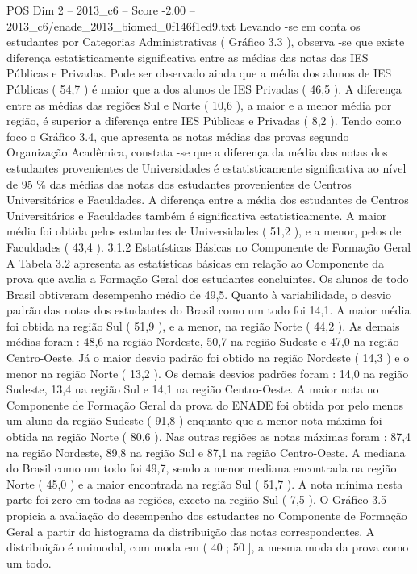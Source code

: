 \begin{textsample}{POS Dim 2 – 2013\_c6 – Score -2.00 – 2013\_c6/enade\_2013\_biomed\_0f146f1ed9.txt}
Levando -se em conta os estudantes por Categorias Administrativas ( Gráfico 3.3 ), observa -se que existe diferença estatisticamente significativa entre as médias das notas das IES Públicas e Privadas.
Pode ser observado ainda que a média dos alunos de IES Públicas ( 54,7 ) é maior que a dos alunos de IES Privadas ( 46,5 ).
A diferença entre as médias das regiões Sul e Norte ( 10,6 ), a maior e a menor média por região, é superior a diferença entre IES Públicas e Privadas ( 8,2 ).
Tendo como foco o Gráfico 3.4, que apresenta as notas médias das provas segundo Organização Acadêmica, constata -se que a diferença da média das notas dos estudantes provenientes de Universidades é estatisticamente significativa ao nível de 95 \% das médias das notas dos estudantes provenientes de Centros Universitários e Faculdades.
A diferença entre a média dos estudantes de Centros Universitários e Faculdades também é significativa estatisticamente.
A maior média foi obtida pelos estudantes de Universidades ( 51,2 ), e a menor, pelos de Faculdades ( 43,4 ). 3.1.2 Estatísticas Básicas no Componente de Formação Geral A Tabela 3.2 apresenta as estatísticas básicas em relação ao Componente da prova que avalia a Formação Geral dos estudantes concluintes.
Os alunos de todo Brasil obtiveram desempenho médio de 49,5.
Quanto à variabilidade, o desvio padrão das notas dos estudantes do Brasil como um todo foi 14,1.
A maior média foi obtida na região Sul ( 51,9 ), e a menor, na região Norte ( 44,2 ).
As demais médias foram : 48,6 na região Nordeste, 50,7 na região Sudeste e 47,0 na região Centro-Oeste.
Já o maior desvio padrão foi obtido na região Nordeste ( 14,3 ) e o menor na região Norte ( 13,2 ).
Os demais desvios padrões foram : 14,0 na região Sudeste, 13,4 na região Sul e 14,1 na região Centro-Oeste.
A maior nota no Componente de Formação Geral da prova do ENADE foi obtida por pelo menos um aluno da região Sudeste ( 91,8 ) enquanto que a menor nota máxima foi obtida na região Norte ( 80,6 ).
Nas outras regiões as notas máximas foram : 87,4 na região Nordeste, 89,8 na região Sul e 87,1 na região Centro-Oeste.
A mediana do Brasil como um todo foi 49,7, sendo a menor mediana encontrada na região Norte ( 45,0 ) e a maior encontrada na região Sul ( 51,7 ).
A nota mínima nesta parte foi zero em todas as regiões, exceto na região Sul ( 7,5 ).
O Gráfico 3.5 propicia a avaliação do desempenho dos estudantes no Componente de Formação Geral a partir do histograma da distribuição das notas correspondentes.
A distribuição é unimodal, com moda em ( 40 ; 50 ], a mesma moda da prova como um todo.

\end{textsample}
